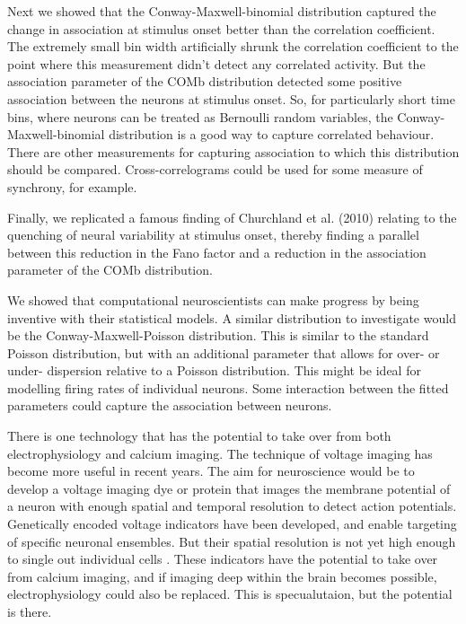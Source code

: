 Next we showed that the Conway-Maxwell-binomial distribution captured the change in association at stimulus onset better than the correlation coefficient. The extremely small bin width artificially shrunk the correlation coefficient to the point where this measurement didn't detect any correlated activity. But the association parameter of the COMb distribution detected some positive association between the neurons at stimulus onset. So, for particularly short time bins, where neurons can be treated as Bernoulli random variables, the Conway-Maxwell-binomial distribution is a good way to capture correlated behaviour. There are other measurements for capturing association to which this distribution should be compared. Cross-correlograms could be used for some measure of synchrony, for example.

Finally, we replicated a famous finding of Churchland et al. (2010) relating to the quenching of neural variability at stimulus onset, thereby finding a parallel between this reduction in the Fano factor and a reduction in the association parameter of the COMb distribution.

We showed that computational neuroscientists can make progress by being inventive with their statistical models. A similar distribution to investigate would be the Conway-Maxwell-Poisson distribution. This is similar to the standard Poisson distribution, but with an additional parameter that allows for over- or under- dispersion relative to a Poisson distribution. This might be ideal for modelling firing rates of individual neurons. Some interaction between the fitted parameters could capture the association between neurons.

There is one technology that has the potential to take over from both electrophysiology and calcium imaging. The technique of voltage imaging has become more useful in recent years. The aim for neuroscience would be to develop a voltage imaging dye or protein that images the membrane potential of a neuron with enough spatial and temporal resolution to detect action potentials. Genetically encoded voltage indicators have been developed, and enable targeting of specific neuronal ensembles. But their spatial resolution is not yet high enough to single out individual cells \parencite{bando}. These indicators have the potential to take over from calcium imaging, and if imaging deep within the brain becomes possible, electrophysiology could also be replaced. This is specualutaion, but the potential is there.
